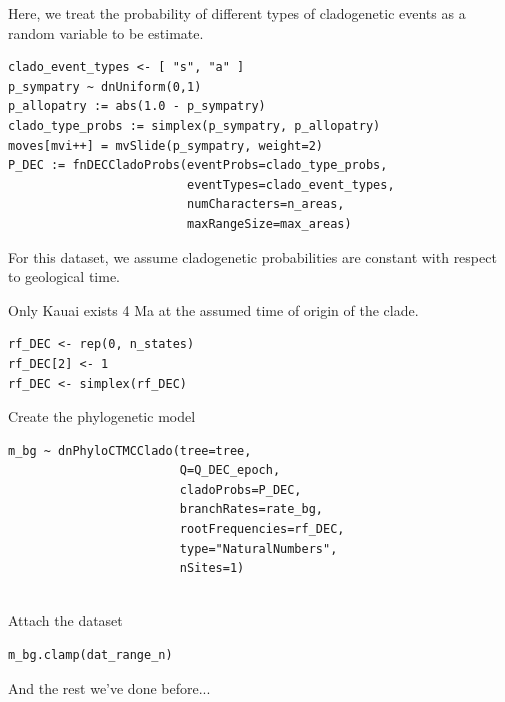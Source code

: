 
Here, we treat the probability of different types of cladogenetic events as a random variable to be estimate.

\begin{snugshade}
\begin{lstlisting}
clado_event_types <- [ "s", "a" ]
p_sympatry ~ dnUniform(0,1)
p_allopatry := abs(1.0 - p_sympatry)
clado_type_probs := simplex(p_sympatry, p_allopatry)
moves[mvi++] = mvSlide(p_sympatry, weight=2)
P_DEC := fnDECCladoProbs(eventProbs=clado_type_probs,
                         eventTypes=clado_event_types,
                         numCharacters=n_areas,
                         maxRangeSize=max_areas)
\end{lstlisting}
\end{snugshade}

For this dataset, we assume cladogenetic probabilities are constant with respect to geological time.


Only Kauai exists 4 Ma at the assumed time of origin of the clade.

\begin{snugshade}
\begin{lstlisting}
rf_DEC <- rep(0, n_states)
rf_DEC[2] <- 1
rf_DEC <- simplex(rf_DEC)
\end{lstlisting}
\end{snugshade}


Create the phylogenetic model
\begin{snugshade}
\begin{lstlisting}
m_bg ~ dnPhyloCTMCClado(tree=tree,
                        Q=Q_DEC_epoch,
                        cladoProbs=P_DEC,
                        branchRates=rate_bg,
                        rootFrequencies=rf_DEC,
                        type="NaturalNumbers",
                        nSites=1)
                  
\end{lstlisting}
\end{snugshade}


Attach the dataset
\begin{snugshade}
\begin{lstlisting}
m_bg.clamp(dat_range_n)
\end{lstlisting}
\end{snugshade}


And the rest we've done before...


